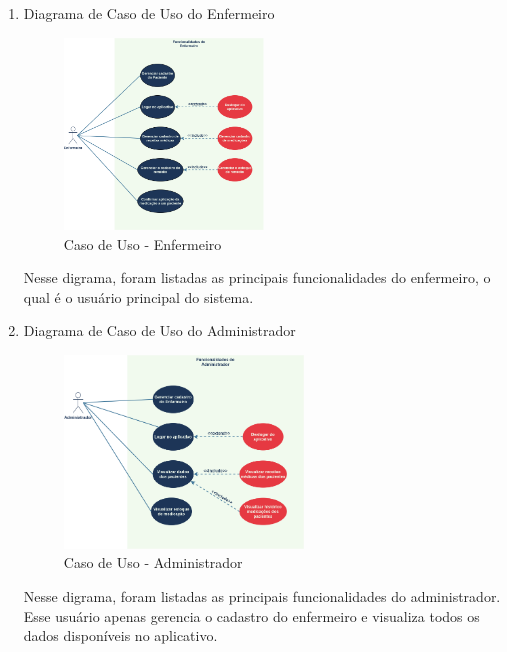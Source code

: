 \begin{enumerate}
    \item Diagrama de Caso de Uso do Enfermeiro
    
\begin{figure}[H]
    \centering
    \includegraphics[width=0.5\textwidth]{figuras/software/UML/enfermeiro-us.png}
    \caption{Caso de Uso - Enfermeiro}
    \label{fig:enfermeiro_us}
\end{figure}

Nesse digrama, foram listadas as principais funcionalidades do enfermeiro, o qual é o usuário principal do sistema.

    \item Diagrama de Caso de Uso do Administrador

\begin{figure}[H]
    \centering
    \includegraphics[width=0.6\textwidth]{figuras/software/UML/administrador-us.png}
    \caption{Caso de Uso - Administrador}
    \label{fig:administrador_us}
\end{figure}

Nesse digrama, foram listadas as principais funcionalidades do administrador. Esse usuário apenas gerencia o cadastro do enfermeiro e visualiza todos os dados disponíveis no aplicativo.

\end{enumerate}


